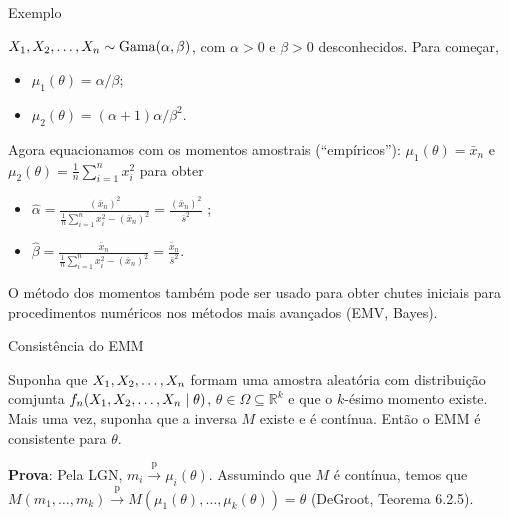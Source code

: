 \begin{frame}{Exemplo}
\begin{exemplo}
$X_1, X_2, \ldots, X_n \sim \operatorname{Gama}(\alpha, \beta)$, com $\alpha >0$ e $\beta>0$ desconhecidos.
Para começar,
\begin{itemize}
 \item $\mu_1(\theta) = \alpha/\beta$;
 \item $\mu_2(\theta) = (\alpha + 1)\alpha/\beta^2$.
\end{itemize}
Agora equacionamos com os momentos amostrais (``empíricos''):
$\mu_1(\theta) = \bar{x}_n$ e $\mu_2(\theta) = \frac{1}{n}\sum_{i=1}^n x_i^2$ para obter
\begin{itemize}
 \item $\hat{\alpha} = \frac{(\bar{x}_n)^2}{\frac{1}{n}\sum_{i=1}^n x_i^2 - (\bar{x}_n)^2} = \frac{(\bar{x}_n)^2}{\bar{s}^2}$ ;
 \item $\hat{\beta} = \frac{\bar{x}_n}{\frac{1}{n}\sum_{i=1}^n x_i^2 - (\bar{x}_n)^2} = \frac{\bar{x}_n}{\bar{s}^2}$.
\end{itemize}
\end{exemplo}
  \begin{obs}
  O método dos momentos também pode ser usado para obter chutes iniciais para procedimentos numéricos nos métodos mais avançados (EMV, Bayes).
 \end{obs}
\end{frame}

\begin{frame}{Consistência do EMM}
 \begin{theo}
 \label{thm:MME_consistency}
    Suponha que $X_1, X_2, \ldots, X_n$ formam uma amostra aleatória com distribuição comjunta $f_n(X_1, X_2, \ldots, X_n \mid \theta)$, $\theta \in \Omega \subseteq \mathbb{R}^k$ e que o $k$-ésimo momento existe.
    Mais uma vez, suponha que a inversa $M$ existe e é contínua.
    Então o EMM é consistente para $\theta$.
 \end{theo}
\textbf{Prova}: Pela LGN, $m_i \xrightarrow{\text{p}}  \mu_i(\theta)$.
Assumindo que $M$ é contínua, temos que $M(m_1, \ldots, m_k) \xrightarrow{\text{p}} M(\mu_1(\theta), \ldots, \mu_k(\theta)) = \theta$  (DeGroot, Teorema 6.2.5).
\end{frame}

